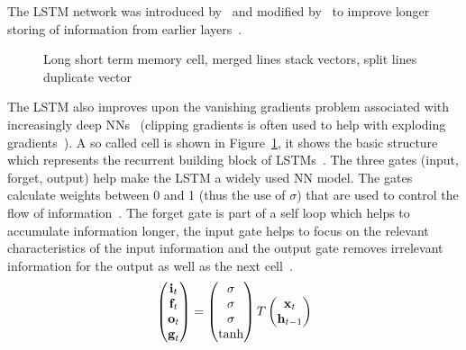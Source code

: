 The \ac{LSTM} network was introduced by~\cite{hochreiter_long_1997} and modified
by~\cite{gers_learning_1999} to improve longer storing of information from earlier
layers~\citep{chauhan_review_2018}.
\begin{figure}[ht]
    \centering
    
    \caption[Long short term memoory cell]{%
        Long short term memory cell, merged lines stack vectors, split lines duplicate
        vector~\citep{goodfellow_deep_2016,yu_review_2019}\label{fig:lstm}
    }
\end{figure}
The \ac{LSTM} also improves upon the vanishing gradients problem associated with
increasingly deep \acp{NN}~\citep{sherstinsky_fundamentals_2020} (clipping gradients is often used
to help with exploding gradients~\citep{goodfellow_deep_2016}).
A so called cell is shown in Figure~\ref{fig:lstm}, it shows the basic structure which represents
the recurrent building block of \acp{LSTM}~\citep{goodfellow_deep_2016}.
The three gates (input, forget, output) help make the \ac{LSTM} a widely used \ac{NN} model.
The gates calculate weights between 0 and 1 (thus the use of $\sigma$) that are used to control
the flow of information~\citep{goodfellow_deep_2016}.
The forget gate is part of a self loop which helps to accumulate information longer, the input
gate helps to focus on the relevant characteristics of the input information
and the output gate removes irrelevant information for the output as well as the next
cell~\citep{goodfellow_deep_2016}.
\begin{equation}\label{eq:lstm-gates}
    \begin{pmatrix}
        \textbf{i}_t \\
        \textbf{f}_t \\
        \textbf{o}_t \\
        \textbf{g}_t
    \end{pmatrix}
    =
    \begin{pmatrix}
        \sigma \\
        \sigma \\
        \sigma \\
        \tanh
    \end{pmatrix}
    T
    \begin{pmatrix}
        \textbf{x}_{t} \\
        \textbf{h}_{t-1}
    \end{pmatrix}
\end{equation}
